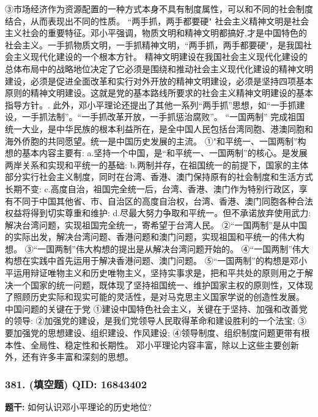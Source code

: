 \documentclass[12pt,UTF8]{ctexart}
\begin{document}
③市场经济作为资源配置的一种方式本身不具有制度属性，可以和不同的社会制度结合，从而表现出不同的性质。
“两手抓，两手都要硬"
社会主义精神文明是社会主义社会的重要特征。邓小平强调，物质文明和精神文明都搞好,才是中国特色的社会主义。一手抓物质文明，一手抓精神文明，“两手抓，两手都要硬"，是我国社会主义现代化建设的一个根本方针。
精神文明建设在我国社会主义现代化建设的总体布局中的战略地位决定了它必须是围绕和推动社会主义现代化建设的精神文明建设，必须是促进全面改革和实行对外开放的精神文明建设，必须是坚持四项基本原则的精神文明建设。这就是党的基本路线所要求的社会主义精神文明建设的基本指导方针。.
此外，邓小平理论还提出了其他一系列“两手抓”思想，如“一手抓建设，一手抓法制”。“一手抓改革开放，一手抓惩治腐败”。
“一国两制”
完成祖国统一大业，是中华民族的根本利益所在，是全中国人民包括台湾同胞、港澳同胞和海外侨胞的共同愿望。统一是中国历史发展的主流。
①"和平统一、一国两制”构想的基本内容主要有:
a.坚持一个中国，是“和平统一、一国两制”的核心。是发展两岸关系和实现和平统一的基础:
b.两制并存，在祖国统一的前提下，国家的主体部分实行社会主义制度，同时在台湾、香港、澳门保持原有的社会制度和生活方式长期不变:
c.高度自治，祖国完全统一后，台湾、香港、澳门作为特别行政区，享有不同于中国其他省、市、自治区的高度自治权，台湾、香港、澳门同胞各种合法权益将得到切实尊重和维护:
d.尽最大努力争取和平统一。但不承诺放弃使用武力:解决台湾问题，实现祖国完全统一，寄希望于台湾人民。
②“一国两制”是从中国的实际出发，解决台湾问题、香港问题和澳门问题，实现祖国和平统一的伟大构想。
③“一国两制”伟大构想的提出是从解决台湾问题开始的。
④“一国两制”伟大构想在实践中首先运用于解决香港问题、澳门问题。
⑤“一国两制”的构想是邓小平运用辩证唯物主义和历史唯物主义，坚持实事求是，把和平共处的原则用之于解决一个国家的统一问题，既体现了坚持祖国统一、维护国家主权的原则性，又体现了照顾历史实际和现实可能的灵活性，是对马克思主义国家学说的创造性发展。
中国问题的关键在于党
①建设中国特色社会主义，关键在于坚持、加强和改善党的领导:
②加强党的建设，是我们党领导人民取得革命和建设胜利的一个法宝;
③要加强党的思想建设、组织建设、作风建设;
④领导制度、组织制度问题更带有根本性、全局性、稳定性和长期性。
邓小平理论内容丰富，除以上这些主要创新外，还有许多丰富和深刻的思想。

\vspace{0.3em}\hrulefill\vspace{0.7em}

\subsubsection*{381. (填空题) \small QID: 16843402}

\textbf{题干:}
如何认识邓小平理论的历史地位?
\end{document}
